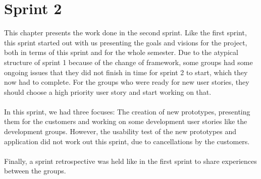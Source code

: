 \chapter{Sprint 2}
This chapter presents the work done in the second sprint.
Like the first sprint, this sprint started out with us presenting the goals and visions for the project, both in terms of this sprint and for the whole semester.
Due to the atypical structure of sprint 1 because of the change of framework, some groups had some ongoing issues that they did not finish in time for sprint 2 to start, which they now had to complete.
For the groups who were ready for new user stories, they should choose a high priority user story and start working on that.
\\\\
In this sprint, we had three focuses: The creation of new prototypes, presenting them for the customers and working on some development user stories like the development groups.
However, the usability test of the new prototypes and application did not work out this sprint, due to cancellations by the customers. 
\\\\
Finally, a sprint retrospective was held like in the first sprint to share experiences between the groups.
